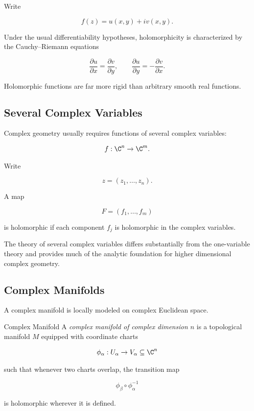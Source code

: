 Write

\[
f(z)=u(x,y)+iv(x,y).
\]

Under the usual differentiability hypotheses, holomorphicity is characterized
by the Cauchy--Riemann equations

\[
\boxed{
\frac{\partial u}{\partial x}
=
\frac{\partial v}{\partial y},
\qquad
\frac{\partial u}{\partial y}
=
-
\frac{\partial v}{\partial x}.
}
\]

Holomorphic functions are far more rigid than arbitrary smooth real
functions.

\subsection{Several Complex Variables}
\label{subsec:several-complex-variables}

Complex geometry usually requires functions of several complex variables:

\[
f:\C^n\to\C^m.
\]

Write

\[
z=(z_1,\ldots,z_n).
\]

A map

\[
F=(f_1,\ldots,f_m)
\]

is holomorphic if each component \(f_j\) is holomorphic in the complex
variables.

The theory of several complex variables differs substantially from the
one-variable theory and provides much of the analytic foundation for higher
dimensional complex geometry.

\subsection{Complex Manifolds}
\label{subsec:complex-manifolds}

A complex manifold is locally modeled on complex Euclidean space.

\begin{definitionbox}{Complex Manifold}
A \emph{complex manifold of complex dimension \(n\)} is a topological
manifold \(M\) equipped with coordinate charts

\[
\phi_\alpha:U_\alpha\to V_\alpha\subseteq\C^n
\]

such that whenever two charts overlap, the transition map

\[
\boxed{
\phi_\beta\circ\phi_\alpha^{-1}
}
\]

is holomorphic wherever it is defined.
\end{definitionbox}

